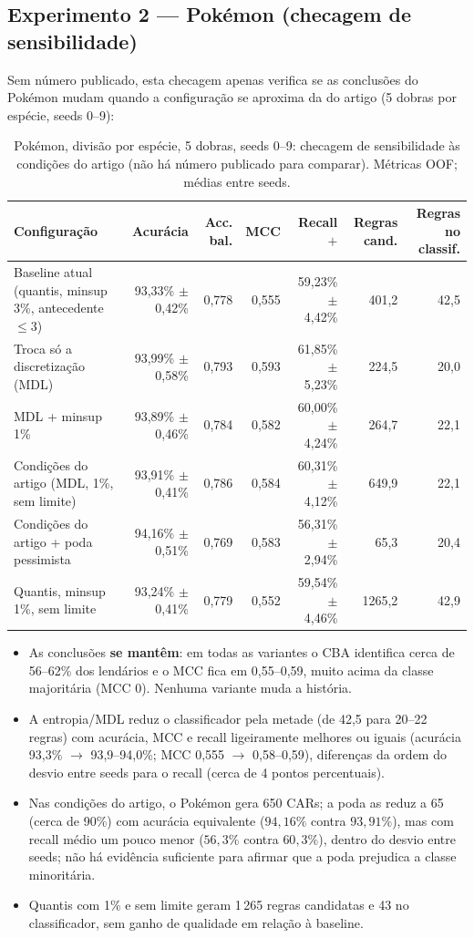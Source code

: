 \documentclass[a4paper,11pt]{article}
\begin{document}
\subsection{Experimento 2 --- Pokémon (checagem de sensibilidade)}
Sem número publicado, esta checagem apenas verifica se as conclusões do Pokémon mudam quando a configuração se aproxima da do artigo (5 dobras por espécie, seeds 0--9):
\begin{table}[htbp]
\centering
\small
\caption{Pokémon, divisão por espécie, 5 dobras, seeds 0--9: checagem de sensibilidade às condições do artigo (não há número publicado para comparar). Métricas OOF; médias entre seeds.}
\label{tab:fid_pokemon}
\begin{tabular}{p{4.6cm}rrrrrr}
\toprule
Configuração & Acurácia & Acc. bal. & MCC & Recall $+$ & Regras cand. & Regras no classif. \\
\midrule
Baseline atual (quantis, minsup 3\%, antecedente $\leq 3$) & 93,33\% $\pm$ 0,42\% & 0,778 & 0,555 & 59,23\% $\pm$ 4,42\% & 401,2 & 42,5 \\
Troca só a discretização (MDL) & 93,99\% $\pm$ 0,58\% & 0,793 & 0,593 & 61,85\% $\pm$ 5,23\% & 224,5 & 20,0 \\
MDL + minsup 1\% & 93,89\% $\pm$ 0,46\% & 0,784 & 0,582 & 60,00\% $\pm$ 4,24\% & 264,7 & 22,1 \\
Condições do artigo (MDL, 1\%, sem limite) & 93,91\% $\pm$ 0,41\% & 0,786 & 0,584 & 60,31\% $\pm$ 4,12\% & 649,9 & 22,1 \\
Condições do artigo + poda pessimista & 94,16\% $\pm$ 0,51\% & 0,769 & 0,583 & 56,31\% $\pm$ 2,94\% & 65,3 & 20,4 \\
Quantis, minsup 1\%, sem limite & 93,24\% $\pm$ 0,41\% & 0,779 & 0,552 & 59,54\% $\pm$ 4,46\% & 1265,2 & 42,9 \\
\bottomrule
\end{tabular}
\end{table}

\begin{itemize}
  \item As conclusões \textbf{se mantêm}: em todas as variantes o CBA identifica cerca de 56--62\% dos lendários e o MCC fica em 0,55--0,59, muito acima da classe majoritária (MCC 0). Nenhuma variante muda a história.
  \item A entropia/MDL reduz o classificador pela metade (de 42,5 para 20--22 regras) com acurácia, MCC e recall ligeiramente melhores ou iguais (acurácia 93,3\% $\to$ 93,9--94,0\%; MCC 0,555 $\to$ 0,58--0,59), diferenças da ordem do desvio entre seeds para o recall (cerca de 4 pontos percentuais).
  \item Nas condições do artigo, o Pokémon gera 650 CARs; a poda as reduz a 65 (cerca de 90\%) com acurácia equivalente ($94{,}16\%$ contra $93{,}91\%$), mas com recall médio um pouco menor ($56{,}3\%$ contra $60{,}3\%$), dentro do desvio entre seeds; não há evidência suficiente para afirmar que a poda prejudica a classe minoritária.
  \item Quantis com 1\% e sem limite geram 1\,265 regras candidatas e 43 no classificador, sem ganho de qualidade em relação à baseline.
\end{itemize}
\end{document}
